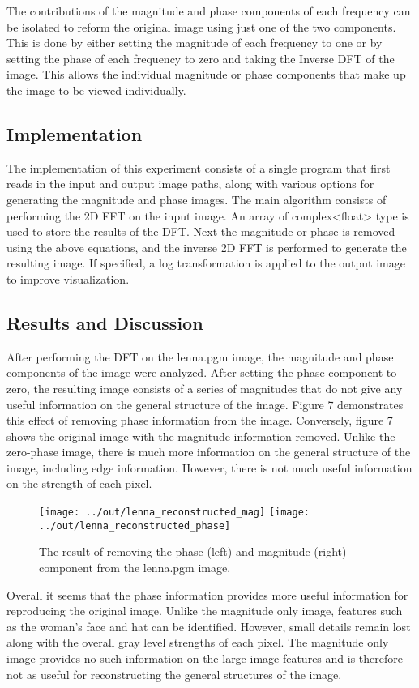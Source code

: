 \documentclass[headings=optiontoheadandtoc,listof=totoc,parskip=full]{scrartcl}
\begin{document}
The contributions of the magnitude and phase components of each frequency can be isolated to reform the original image using just one of the two components. This is done by either setting the magnitude of each frequency to one or by setting the phase of each frequency to zero and taking the Inverse DFT of the image. This allows the individual magnitude or phase components that make up the image to be viewed individually.

\subsection{Implementation}

The implementation of this experiment consists of a single program that first reads in the input and output image paths, along with various options for generating the magnitude and phase images. The main algorithm consists of performing the 2D FFT on the input image. An array of complex<float> type is used to store the results of the DFT. Next the magnitude or phase is removed using the above equations, and the inverse 2D FFT is performed to generate the resulting image. If specified, a log transformation is applied to the output image to improve visualization.

\subsection{Results and Discussion}

After performing the DFT on the lenna.pgm image, the magnitude and phase components of the image were analyzed. After setting the phase component to zero, the resulting image consists of a series of magnitudes that do not give any useful information on the general structure of the image. Figure 7 demonstrates this effect of removing phase information from the image. Conversely, figure 7 shows the original image with the magnitude information removed. Unlike the zero-phase image, there is much more information on the general structure of the image, including edge information. However, there is not much useful information on the strength of each pixel.

\begin{figure}[ht]
	\centering
	\texttt{[image: ../out/lenna\_reconstructed\_mag]}
	\texttt{[image: ../out/lenna\_reconstructed\_phase]}
	\caption{The result of removing the phase (left) and magnitude (right) component from the lenna.pgm image.}
	\label{fig:lenna_mag_phase}
\end{figure}

Overall it seems that the phase information provides more useful information for reproducing the original image. Unlike the magnitude only image, features such as the woman’s face and hat can be identified. However, small details remain lost along with the overall gray level strengths of each pixel. The magnitude only image provides no such information on the large image features and is therefore not as useful for reconstructing the general structures of the image.
\end{document}
